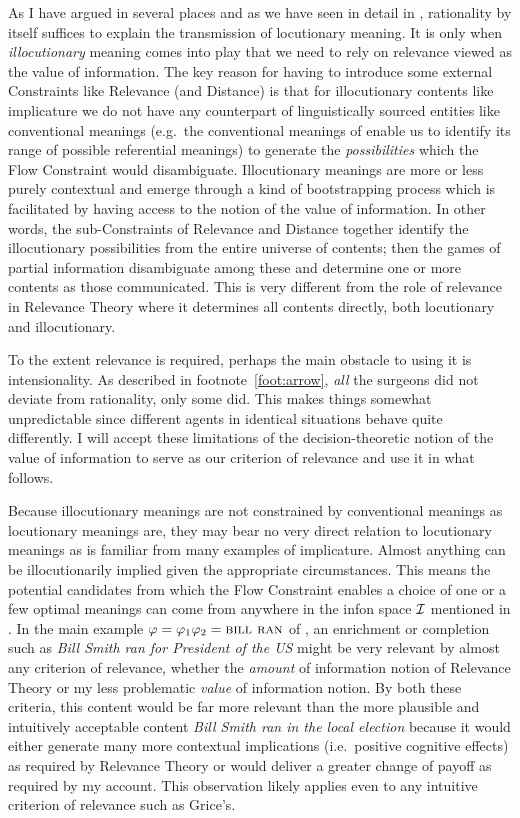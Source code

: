 As I have argued in several places and as we have seen in detail in , rationality by itself suffices to explain the transmission of locutionary meaning. It is only when \emph{illocutionary} meaning comes into play that we need to rely on relevance viewed as the value of information. The key reason for having to introduce some external Constraints like Relevance (and Distance) is that for illocutionary contents like implicature we do not have any counterpart of linguistically sourced entities like conventional meanings (e.g.\ the conventional meanings of  enable us to identify its range of possible referential meanings) to generate the \emph{possibilities} which the Flow Constraint would disambiguate. Illocutionary meanings are more or less purely contextual and emerge through a kind of bootstrapping process which is facilitated by having access to the notion of the value of information. In other words, the sub-Constraints of Relevance and Distance together identify the illocutionary possibilities from the entire universe of contents; then the games of partial information disambiguate among these and determine one or more contents as those communicated. This is very different from the role of relevance in Relevance Theory where it determines all contents directly, both locutionary and illocutionary.

To the extent relevance is required, perhaps the main obstacle to using it is intensionality. As described in footnote~\ref{foot:arrow}, \emph{all} the surgeons did not deviate from rationality, only some did. This makes things somewhat unpredictable since different agents in identical situations behave quite differently. I will accept these limitations of the decision-theoretic notion of the value of information to serve as our criterion of relevance and use it in what follows.

Because illocutionary meanings are not constrained by conventional meanings as locutionary meanings are, they may bear no very direct relation to locutionary meanings as is familiar from many examples of implicature. Almost anything can be illocutionarily implied given the appropriate circumstances. This means the potential candidates from which the Flow Constraint enables a choice of one or a few optimal meanings can come from anywhere in the infon space $\cal I$ mentioned in . In the main example $\varphi = \varphi_1\varphi_2 = \Expression{Bill ran}$ of , an enrichment or completion such as \emph{Bill Smith ran for President of the US} might be very relevant by almost any criterion of relevance, whether the \emph{amount} of information notion of Relevance Theory or my less problematic \emph{value} of information notion. By both these criteria, this content would be far more relevant than the more plausible and intuitively acceptable content \emph{Bill Smith ran in the local election} because it would either generate many more contextual implications (i.e.\ positive cognitive effects) as required by Relevance Theory or would deliver a greater change of payoff as required by my account. This observation likely applies even to any intuitive criterion of relevance such as Grice's.

